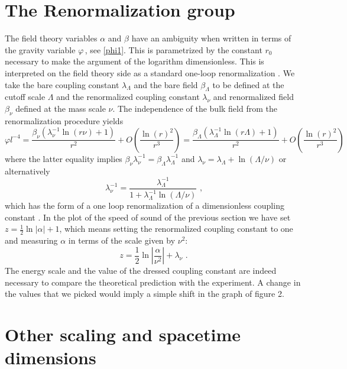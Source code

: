 \documentclass[11pt,epsf,letterpaper]{article}%
\begin{document}
\section{The Renormalization group}

The field theory variables $\alpha$ and $\beta$ have an ambiguity when written
in terms of the gravity variable $\varphi\,$, see \eqref{phi1}. This is
parametrized by the constant $r_{0}$ necessary to make the argument of the
logarithm dimensionless. This is interpreted on the field theory side as a
standard one-loop renormalization \cite{Witten:2001ua}. We take the bare
coupling constant $\lambda_{\Lambda}$ and the bare field $\beta_{\Lambda}$ to
be defined at the cutoff scale $\Lambda$ and the renormalized coupling
constant $\lambda_{\nu}$ and renormalized field $\beta_{\nu}$ defined at the
mass scale $\nu$. The independence of the bulk field from the renormalization
procedure yields
\begin{equation}
\varphi l^{-4}=\frac{\beta_{\nu}\left(  \lambda_{\nu}^{-1}\ln\left(
r\nu\right)  +1\right)  }{r^{2}}+O(\frac{\ln(r)^{2}}{r^{3}})=\frac
{\beta_{\Lambda}\left(  \lambda_{\Lambda}^{-1}\ln\left(  r\Lambda\right)
+1\right)  }{r^{2}}+O(\frac{\ln(r)^{2}}{r^{3}}) \label{eq7-2}%
\end{equation}
where the latter equality implies $\beta_{\nu}\lambda_{\nu}^{-1}%
=\beta_{\Lambda}\lambda_{\Lambda}^{-1}$ and $\lambda_{\nu}=\lambda_{\Lambda
}+\ln\left(  \Lambda/\nu\right)  $ or alternatively
\begin{equation}
\lambda_{\nu}^{-1}=\frac{\lambda_{\Lambda}^{-1}}{1+\lambda_{\Lambda}^{-1}%
\ln\left(  \Lambda/\nu\right)  }\text{ ,} \label{lambda}%
\end{equation}
which has the form of a one loop renormalization of a dimensionless coupling
constant \cite{Witten:2001ua}. In the plot of the speed of sound of the
previous section we have set $z=\frac{1}{2}\ln\left\vert \alpha\right\vert
+1$, which means setting the renormalized coupling constant to one and
measuring $\alpha$ in terms of the scale given by $\nu^{2}$:
\begin{equation}
z=\frac{1}{2}\ln\left\vert \frac{\alpha}{\nu^{2}}\right\vert +\lambda_{\nu
}\text{ .} \label{z}%
\end{equation}
The energy scale and the value of the dressed coupling constant are indeed
necessary to compare the theoretical prediction with the experiment. A change
in the values that we picked would imply a simple shift in the graph of figure 2.

\section{Other scaling and spacetime dimensions}
\end{document}
